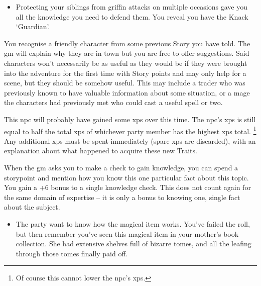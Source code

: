 \begin{multicols}{2}
\begin{itemize}
\item Protecting your siblings from griffin attacks on multiple occasions gave you all the knowledge you need to defend them.
You reveal you have the Knack `Guardian'.
\end{itemize}

\label{oldnpc}
You recognise a friendly character from some previous Story you have told.
The \gls{gm} will explain why they are in town but you are free to offer suggestions.
Said characters won't necessarily be as useful as they would be if they were brought into the \gls{adventure} for the first time with Story points and may only help for a scene, but they should be somehow useful.
This may include a trader who was previously known to have valuable information about some situation, or a mage the characters had previously met who could cast a useful spell or two.

This \gls{npc} will probably have gained some \glspl{xp} over this time.
The \gls{npc}'s \glspl{xp} is still equal to half the total \glspl{xp} of whichever party member has the highest \glspl{xp} total.
\footnote{Of course this cannot lower the \gls{npc}'s \glspl{xp}.}%
Any additional \glspl{xp} must be spent immediately (spare \glspl{xp} are discarded), with an explanation about what happened to acquire these new Traits.

When the \gls{gm} asks you to make a check to gain knowledge, you can spend a \gls{storypoint} and mention how you know this one particular fact about this topic.
You gain a +6 bonus to a single knowledge check.
This does not count again for the same domain of expertise -- it is only a bonus to knowing one, single fact about the subject.

\begin{itemize}
\item
The party want to know how the magical item works.
You've failed the roll, but then remember you've seen this magical item in your mother's book collection.
She had extensive shelves full of bizarre tomes, and all the leafing through those tomes finally paid off.
\iftoggle{aif}{
    \item
    Once, in the \gls{shatteredcastle}, you overheard two guards talking with each other about a door in the hub.
    You know it's in Whiteplains somewhere, and their talk of elves gave you a rough idea of the location.
  \item
  It was unclear if the noble was telling the truth, but you recognise the dyes on his tunic; they come only from the Shale, which can only mean one thing\ldots
}{
  \item
  The party have you idea where they are, but you suddenly remember your uncle's maps.
  They were always plastered all over the walls, and you used to imagine walking in those distant lands.
}
\end{itemize}


\end{multicols}
